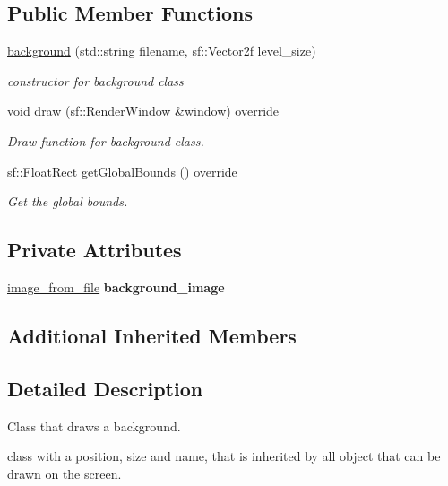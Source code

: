 \subsection*{Public Member Functions}
\begin{DoxyCompactItemize}
\item 
\hyperlink{classbackground_ad199eead2ef4a4d867f2542d3a152471}{background} (std\+::string filename, sf\+::\+Vector2f level\+\_\+size)
\begin{DoxyCompactList}\small\item\em constructor for background class \end{DoxyCompactList}\item 
void \hyperlink{classbackground_a41736f9a00defad1e84b3a8099c887e2}{draw} (sf\+::\+Render\+Window \&window) override
\begin{DoxyCompactList}\small\item\em Draw function for background class. \end{DoxyCompactList}\item 
sf\+::\+Float\+Rect \hyperlink{classbackground_ab5f2b627cd58e0d07678f0af01c6bd2d}{get\+Global\+Bounds} () override
\begin{DoxyCompactList}\small\item\em Get the global bounds. \end{DoxyCompactList}\end{DoxyCompactItemize}
\subsection*{Private Attributes}
\begin{DoxyCompactItemize}
\item 
\mbox{\label{classbackground_a972ef28e3ac5aea925fc9d00e809d5af}} 
\hyperlink{classimage__from__file}{image\+\_\+from\+\_\+file} {\bfseries background\+\_\+image}
\end{DoxyCompactItemize}
\subsection*{Additional Inherited Members}


\subsection{Detailed Description}
Class that draws a background. 

class with a position, size and name, that is inherited by all object that can be drawn on the screen.

